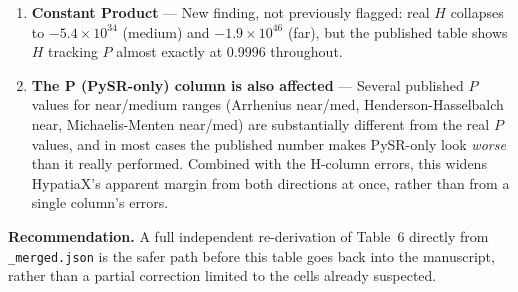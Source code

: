 \documentclass[10pt]{article}
\begin{document}
\begin{landscape}
\begin{enumerate}
\item \textbf{Constant Product} --- New finding, not previously flagged: real $H$ collapses to $-5.4\times10^{34}$ (medium) and $-1.9\times10^{46}$ (far), but the published table shows $H$ tracking $P$ almost exactly at 0.9996 throughout.

\item \textbf{The P (PySR-only) column is also affected} --- Several published $P$ values for near/medium ranges (Arrhenius near/med, Henderson-Hasselbalch near, Michaelis-Menten near/med) are substantially different from the real $P$ values, and in most cases the published number makes PySR-only look \emph{worse} than it really performed. Combined with the H-column errors, this widens HypatiaX's apparent margin from both directions at once, rather than from a single column's errors.
\end{enumerate}

\textbf{Recommendation.} A full independent re-derivation of Table~6 directly from \texttt{\_merged.json} is the safer path before this table goes back into the manuscript, rather than a partial correction limited to the cells already suspected.

\end{landscape}
\end{document}

